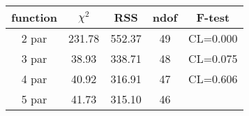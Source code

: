 \begin{tabular}{c|c|c|c|c}
function & $\chi^2$ & RSS & ndof & F-test \\
\hline
2 par & 231.78 & 552.37 & 49 & CL=0.000 \\
3 par & 38.93 & 338.71 & 48 & CL=0.075 \\
4 par & 40.92 & 316.91 & 47 & CL=0.606 \\
5 par & 41.73 & 315.10 & 46 & \\
\hline
\end{tabular}